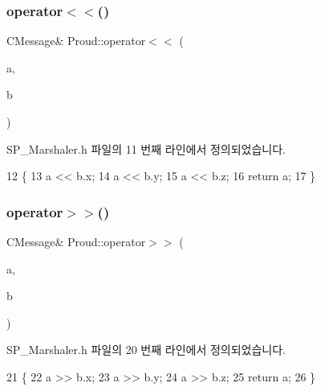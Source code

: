 \subsubsection{\texorpdfstring{operator$<$$<$()}{operator<<()}}
{\footnotesize\ttfamily C\+Message\& Proud\+::operator$<$$<$ (\begin{DoxyParamCaption}\item[{C\+Message \&}]{a,  }\item[{const Proud\+::\+Vector3 \&}]{b }\end{DoxyParamCaption})\hspace{0.3cm}{\ttfamily [inline]}}



S\+P\+\_\+\+Marshaler.\+h 파일의 11 번째 라인에서 정의되었습니다.


\begin{DoxyCode}
12     \{
13         a << b.x;
14         a << b.y;
15         a << b.z;
16         \textcolor{keywordflow}{return} a;
17     \}
\end{DoxyCode}
\mbox{\label{namespace_proud_a822c4aed58c18f332db22ab629174841}} 
\subsubsection{\texorpdfstring{operator$>$$>$()}{operator>>()}}
{\footnotesize\ttfamily C\+Message\& Proud\+::operator$>$$>$ (\begin{DoxyParamCaption}\item[{C\+Message \&}]{a,  }\item[{Proud\+::\+Vector3 \&}]{b }\end{DoxyParamCaption})\hspace{0.3cm}{\ttfamily [inline]}}



S\+P\+\_\+\+Marshaler.\+h 파일의 20 번째 라인에서 정의되었습니다.


\begin{DoxyCode}
21     \{
22         a >> b.x;
23         a >> b.y;
24         a >> b.z;
25         \textcolor{keywordflow}{return} a;
26     \}
\end{DoxyCode}

